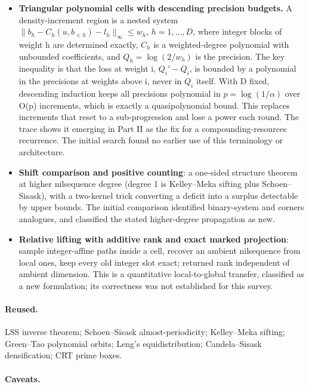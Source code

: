 \documentclass[11pt]{article}
\providecommand{\lt}{<}
\begin{document}
\begin{itemize}
\item \textbf{Triangular polynomial cells with descending precision budgets.} A density-increment region is a nested system $\|b_h-C_h(u,b_{\lt h})-l_h\|_\infty\le w_h$, $h=1,\dots,D$, where integer blocks of weight h are determined exactly, $C_h$ is a weighted-degree polynomial with unbounded coefficients, and $Q_h=\log(2/w_h)$ is the precision. The key inequality is that the loss at weight i, $Q_i'-Q_i$, is bounded by a polynomial in the precisions at weights above i, never in $Q_i$ itself. With D fixed, descending induction keeps all precisions polynomial in $p=\log(1/\alpha)$ over O(p) increments, which is exactly a quasipolynomial bound. This replaces increments that reset to a sub-progression and lose a power each round. The trace shows it emerging in Part II as the fix for a compounding-resources recurrence. The initial search found no earlier use of this terminology or architecture.
\item \textbf{Shift comparison and positive counting}: a one-sided structure theorem at higher nilsequence degree (degree 1 is Kelley--Meka sifting plus Schoen--Sisask), with a two-kernel trick converting a deficit into a surplus detectable by upper bounds. The initial comparison identified binary-system and corners analogues, and classified the stated higher-degree propagation as new.
\item \textbf{Relative lifting with additive rank and exact marked projection}: sample integer-affine paths inside a cell, recover an ambient nilsequence from local ones, keep every old integer slot exact; returned rank independent of ambient dimension. This is a quantitative local-to-global transfer, classified as a new formulation; its correctness was not established for this survey.
\end{itemize}

\paragraph{Reused.}

LSS inverse theorem; Schoen--Sisask almost-periodicity; Kelley--Meka sifting; Green--Tao polynomial orbits; Leng's equidistribution; Candela--Sisask densification; CRT prime boxes.

\paragraph{Caveats.}
\end{document}
